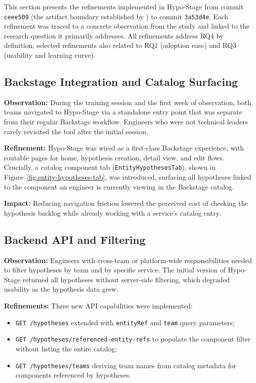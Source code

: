 This section presents the refinements implemented in Hypo-Stage from commit
\texttt{ceee509} (the artifact boundary established by \citealt{correa2025}) to
commit \texttt{3a53d4e}. Each refinement was traced
to a concrete observation from the study and linked to the research question it
primarily addresses. All refinements address RQ4 by definition; selected
refinements also related to RQ1 (adoption ease) and RQ3 (usability and learning
curve).

\subsection{Backstage Integration and Catalog Surfacing}
\label{subsec:refinement-backstage}

\textbf{Observation:} During the training session and the first week of
observation, both teams navigated to Hypo-Stage via a standalone entry point
that was separate from their regular Backstage workflow. Engineers who were not
technical leaders rarely revisited the tool after the initial session.

\textbf{Refinement:} Hypo-Stage was wired as a first-class Backstage experience,
with routable pages for home, hypothesis creation, detail view, and edit flows.
Crucially, a catalog component tab (\texttt{EntityHypothesesTab}), shown in Figure~\ref{fig:entity-hypotheses-tab}, was introduced,
surfacing all hypotheses linked to the component an engineer is currently viewing
in the Backstage catalog.

\textbf{Impact:} Reducing navigation friction lowered the perceived cost of
checking the hypothesis backlog while already working with a service's catalog
entry.

\subsection{Backend API and Filtering}
\label{subsec:refinement-api}

\textbf{Observation:} Engineers with cross-team or platform-wide responsibilities
needed to filter hypotheses by team and by specific service. The initial
version of Hypo-Stage returned all hypotheses without server-side filtering,
which degraded usability as the hypothesis data grew.

\textbf{Refinements:} Three new API capabilities were implemented:
\begin{itemize}
  \item \texttt{GET /hypotheses} extended with \texttt{entityRef} and \texttt{team}
    query parameters;
  \item \texttt{GET /hypotheses/referenced-entity-refs} to populate the component
    filter without listing the entire catalog;
  \item \texttt{GET /hypotheses/teams} deriving team names from catalog metadata
    for components referenced by hypotheses.
\end{itemize}

